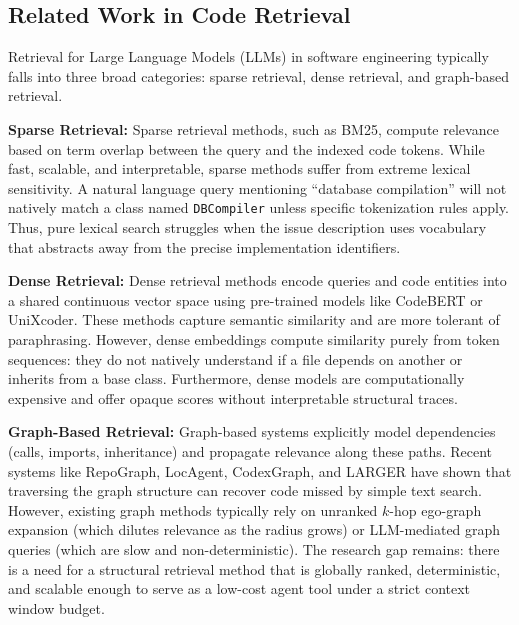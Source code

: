 \subsection{Related Work in Code Retrieval}

Retrieval for Large Language Models (LLMs) in software engineering typically falls into three broad categories: sparse retrieval, dense retrieval, and graph-based retrieval.

\textbf{Sparse Retrieval:} Sparse retrieval methods, such as BM25, compute relevance based on term overlap between the query and the indexed code tokens. While fast, scalable, and interpretable, sparse methods suffer from extreme lexical sensitivity. A natural language query mentioning ``database compilation'' will not natively match a class named \texttt{DBCompiler} unless specific tokenization rules apply. Thus, pure lexical search struggles when the issue description uses vocabulary that abstracts away from the precise implementation identifiers.

\textbf{Dense Retrieval:} Dense retrieval methods encode queries and code entities into a shared continuous vector space using pre-trained models like CodeBERT or UniXcoder. These methods capture semantic similarity and are more tolerant of paraphrasing. However, dense embeddings compute similarity purely from token sequences: they do not natively understand if a file depends on another or inherits from a base class. Furthermore, dense models are computationally expensive and offer opaque scores without interpretable structural traces.

\textbf{Graph-Based Retrieval:} Graph-based systems explicitly model dependencies (calls, imports, inheritance) and propagate relevance along these paths. Recent systems like RepoGraph, LocAgent, CodexGraph, and LARGER have shown that traversing the graph structure can recover code missed by simple text search. However, existing graph methods typically rely on unranked $k$-hop ego-graph expansion (which dilutes relevance as the radius grows) or LLM-mediated graph queries (which are slow and non-deterministic). The research gap remains: there is a need for a structural retrieval method that is globally ranked, deterministic, and scalable enough to serve as a low-cost agent tool under a strict context window budget.
